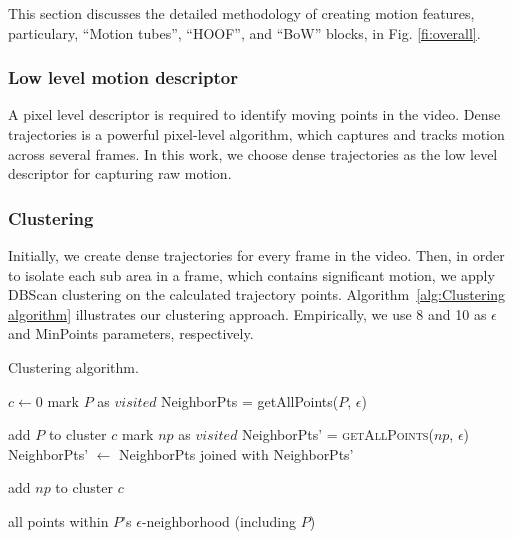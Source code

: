 This section discusses the detailed methodology of creating motion features, particulary, ``Motion tubes'', ``HOOF'', and ``BoW'' blocks, in Fig. \ref{fi:overall}.


\subsubsection{Low level motion descriptor}
A pixel level descriptor is required to identify moving points in the video. Dense trajectories \cite{wang2011action} is a powerful
pixel-level algorithm, which captures and tracks motion across several frames. In this work,
we choose dense trajectories as the low level descriptor for capturing raw motion.

\subsubsection{Clustering}

Initially, we create dense trajectories for every frame in the video.
Then, in order to isolate each sub area in a frame, which contains significant motion, we apply DBScan clustering on the
calculated trajectory points.
Algorithm~\ref{alg:Clustering algorithm}  illustrates our clustering approach. Empirically, we use 8 and 10 as $\epsilon$ and MinPoints parameters, respectively.



\begin{algorithm}
 \caption{Clustering algorithm.}
   \label{alg:Clustering algorithm}
    \begin{algorithmic}[1]
        \State $c \leftarrow 0$ 
	  \EndIf
            \State mark $P$ as $visited$
            \State NeighborPts = getAllPoints($P$, $\epsilon$)
          \Else
          \EndIf
        \EndFor
       \EndFunction

	\State add $P$ to cluster $c$
	    \State mark $np$ as $visited$
	    \State NeighborPts' = \textsc{getAllPoints}($np$, $\epsilon$)
            \State NeighborPts' $\leftarrow$ NeighborPts joined with NeighborPts'
            \EndIf
	
	  \EndIf
         \State add $np$ to cluster $c$
         \EndIf
	\EndFor
       \EndFunction

       \Return all points within $P$'s $\epsilon$-neighborhood (including $P$)
       \EndFunction
\end{algorithmic}

\end{algorithm}


